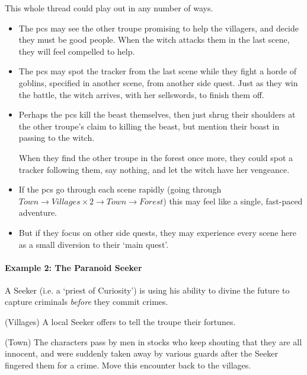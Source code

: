 \begin{multicols}{2}

\noindent
This whole thread could play out in any number of ways.

\begin{itemize}
  \item
  The \glspl{pc} may see the other troupe promising to help the villagers, and decide they must be good people.
  When the witch attacks them in the last scene, they will feel compelled to help.
  \item
  The \glspl{pc} may spot the tracker from the last scene while they fight a horde of goblins, specified in another scene, from another side quest.
  Just as they win the battle, the witch arrives, with her sellswords, to finish them off.
  \item
  Perhaps the \glspl{pc} kill the beast themselves, then just shrug their shoulders at the other troupe's claim to killing the beast, but mention their boast in passing to the witch.

  When they find the other troupe in the forest once more, they could spot a tracker following them, say nothing, and let the witch have her vengeance.
  \item
  If the \glspl{pc} go through each scene rapidly (going through $Town \rightarrow Villages \times 2 \rightarrow Town \rightarrow Forest$) this may feel like a single, fast-paced adventure.
  \item
  But if they focus on other side quests, they may experience every scene here as a small diversion to their `main quest'.
\end{itemize}

\paragraph{Example 2: The Paranoid Seeker}

\begin{exampletext}

A Seeker (i.e. a `priest of Curiosity') is using his ability to divine the future to capture criminals \emph{before} they commit crimes.

\begin{list}{\sqn}{}

  \item[\sqr\squash]
  (Villages) A local Seeker offers to tell the troupe their fortunes.

  \item
  (Town) The characters pass by men in stocks who keep shouting that they are all innocent, and were suddenly taken away by various guards after the Seeker fingered them for a crime.
  Move this encounter back to the villages.


\end{list}
\end{exampletext}
\end{multicols}
